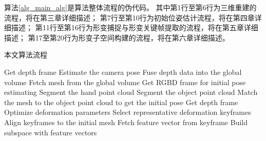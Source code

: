 算法\ref{alg_main_alg}是算法整体流程的伪代码。
其中第1行至第6行为三维重建的流程，将在第三章详细描述；
第7行至第10行为初始位姿估计流程，将在第四章详细描述；
第11行至第16行为形变捕捉与形变关键帧提取的流程，将在第五章详细描述；
第17至第20行为形变子空间构建的流程，将在第六章详细描述。
\begin{algorithm}
    \caption{本文算法流程}
    \label{alg_main_alg}
    \begin{algorithmic}[1]
            \State Get depth frame
            \State Estimate the camera pose
            \State Fuse depth data into the global volume
        \EndFor
        \State Fetch mesh from the global volume
        \State Get RGBD frame for initial pose estimating
        \State Segment the hand point cloud
        \State Segment the object point cloud
        \State Match the mesh to the object point cloud to get the  initial pose
            \State Get depth frame
            \State Optimize deformation parameters
        \EndFor
        \State Select representative deformation keyframes
        \State Align keyframes to the initial mesh
            \State Fetch feature vector from keyframe
        \EndFor
        \State Build subspace with feature vectors
    \end{algorithmic}
\end{algorithm} 